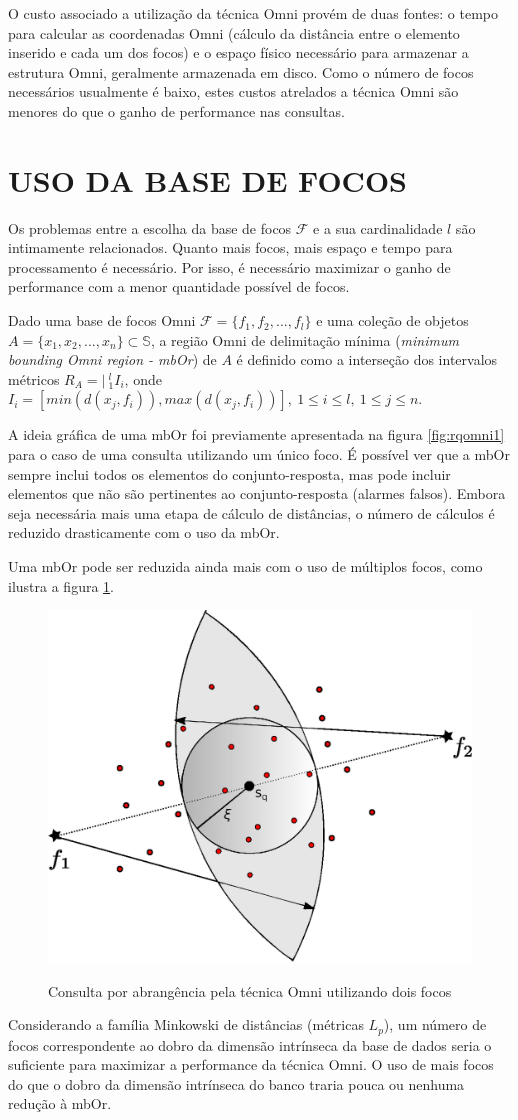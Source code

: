 O custo associado a utilização da técnica Omni provém de duas fontes: o tempo para calcular as coordenadas Omni (cálculo da distância
entre o elemento inserido e cada um dos focos) e o espaço físico necessário para armazenar a estrutura Omni, geralmente armazenada em disco.
Como o número de focos necessários usualmente é baixo, estes custos atrelados a técnica Omni são menores do que o ganho
de performance nas consultas.

\section{USO DA BASE DE FOCOS}
Os problemas entre a escolha da base de focos $\mathscr{F}$ e a sua cardinalidade $l$ são intimamente relacionados. Quanto
mais focos, mais espaço e tempo para processamento é necessário. Por isso, é necessário maximizar o ganho de performance com
a menor quantidade possível de focos.

\begin{mydef}
 Dado uma base de focos Omni $\mathscr{F} = \{f_1, f_2, ..., f_l\}$ e uma coleção de objetos $A = \{x_1,x_2,...,x_n\} \subset \mathbb{S}$, a
 região Omni de delimitação mínima (\textit{minimum bounding Omni region - mbOr}) de $A$ é definido como a interseção
 dos intervalos métricos $R_A = |\  ^{l}_{1}I_i$, onde $I_i = [min(d(x_j, f_i)), max(d(x_j, f_i))],\ 1\leq i \leq l,\ 1 \leq j \leq n$. 
\end{mydef}

A ideia gráfica de uma mbOr foi previamente apresentada na figura \ref{fig:rqomni1} para o caso de uma consulta utilizando um único foco.
É possível ver que a mbOr sempre inclui todos os elementos do conjunto-resposta, mas pode incluir elementos que não são pertinentes
ao conjunto-resposta (alarmes falsos). Embora seja necessária mais uma etapa de cálculo de distâncias, o número de cálculos é
reduzido drasticamente com o uso da mbOr.\par

Uma mbOr pode ser reduzida ainda mais com o uso de múltiplos focos, como ilustra a figura \ref{fig:rqomni2}.

\begin{figure}[H]
\centering
\caption{Consulta por abrangência pela técnica Omni utilizando dois focos}
\includegraphics[width=.4\textwidth]{dados/figuras/rg_omni_2.eps}
\label{fig:rqomni2}
\end{figure}
Considerando a família Minkowski de distâncias (métricas $L_p$), um número de focos correspondente ao dobro da
dimensão intrínseca da base de dados seria o suficiente para maximizar a performance da técnica Omni. O uso de mais focos do que o dobro
da dimensão intrínseca do banco traria pouca ou nenhuma redução à mbOr.

